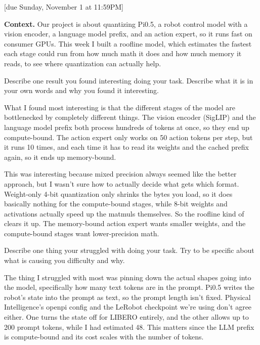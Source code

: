 \documentclass{article}
\begin{document}
[due Sunday, November 1 at 11:59PM]

\noindent\textbf{Context.} Our project is about quantizing Pi0.5, a robot control model with a vision encoder, a language model prefix, and an action expert, so it runs fast on consumer GPUs. This week I built a roofline model, which estimates the fastest each stage could run from how much math it does and how much memory it reads, to see where quantization can actually help.

\begin{probset}
\begin{prob}
    Describe one result you found interesting doing your task. Describe what it is in your own words and why you found it interesting.

    \begin{soln}
        What I found most interesting is that the different stages of the model are bottlenecked by completely different things. The vision encoder (SigLIP) and the language model prefix both process hundreds of tokens at once, so they end up compute-bound. The action expert only works on 50 action tokens per step, but it runs 10 times, and each time it has to read its weights and the cached prefix again, so it ends up memory-bound.

        This was interesting because mixed precision always seemed like the better approach, but I wasn't sure how to actually decide what gets which format. Weight-only 4-bit quantization only shrinks the bytes you load, so it does basically nothing for the compute-bound stages, while 8-bit weights and activations actually speed up the matmuls themselves. So the roofline kind of clears it up. The memory-bound action expert wants smaller weights, and the compute-bound stages want lower-precision math.
    \end{soln}
\end{prob}

\begin{prob}
    Describe one thing your struggled with doing your task. Try to be specific about what is causing you difficulty and why.

    \begin{soln}
        The thing I struggled with most was pinning down the actual shapes going into the model, specifically how many text tokens are in the prompt. Pi0.5 writes the robot's state into the prompt as text, so the prompt length isn't fixed. Physical Intelligence's openpi config and the LeRobot checkpoint we're using don't agree either. One turns the state off for LIBERO entirely, and the other allows up to 200 prompt tokens, while I had estimated 48. This matters since the LLM prefix is compute-bound and its cost scales with the number of tokens.
    \end{soln}
\end{prob}


\end{probset}
\end{document}
